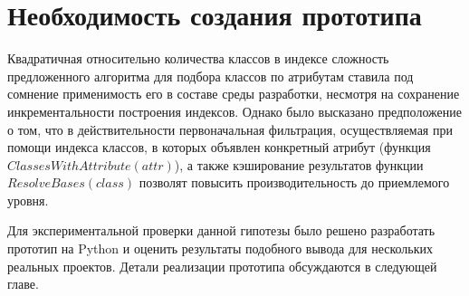 \section{Необходимость создания прототипа}
\label{sec:prototype-necessity}

Квадратичная относительно количества классов в индексе сложность
предложенного алгоритма для подбора классов по атрибутам ставила под сомнение
применимость его в составе среды разработки, несмотря на сохранение
инкрементальности построения индексов. Однако было высказано предположение
о том, что в действительности первоначальная фильтрация, осуществляемая при
помощи индекса классов, в которых объявлен конкретный атрибут (функция
$ClassesWithAttribute(attr)$), а также кэширование результатов функции
$ResolveBases(class)$ позволят повысить производительность до приемлемого
уровня.

Для экспериментальной проверки данной гипотезы было решено разработать прототип
на Python и оценить результаты подобного вывода для нескольких реальных
проектов. Детали реализации прототипа обсуждаются в следующей главе.






